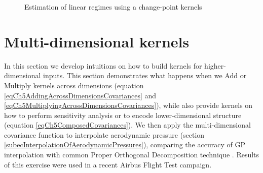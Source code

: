 \begin{figure}[!ht]
  \centering
    \quad
        \caption{Estimation of linear regimes using a change-point kernels}
        \label{figPosteriorChangePointKernel}
\end{figure}


\section{Multi-dimensional kernels}\label{secMultiDimensionalKernels}
In this section we develop intuitions on how to build kernels for higher-dimensional inputs. This section demonstrates what happens when we Add or Multiply kernels across dimensions (equation \ref{eqCh5AddingAcrossDimensionsCovariances} and \ref{eqCh5MultiplyingAcrossDimensionsCovariances}), while also provide kernels on how to perform sensitivity analysis or to encode lower-dimensional structure (equation \ref{eqCh5ComposedCovariances}). We then apply the multi-dimensional covariance function to interpolate aerodynamic pressure (section \ref{subecInterpolationOfAerodynamicPressures}), comparing the accuracy of GP interpolation with common Proper Orthogonal Decomposition technique \cite{oatao18004}. Results of this exercise were used in a recent Airbus Flight Test campaign. 

